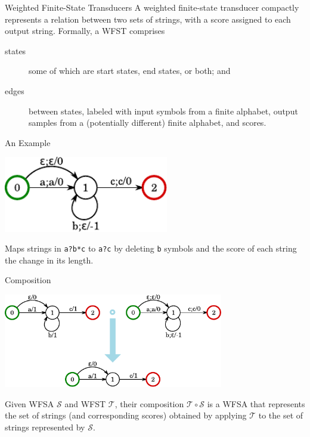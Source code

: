 \begin{frame}{Weighted Finite-State Transducers}{}
  A \alert{weighted finite-state transducer} compactly represents a
  relation between two sets of strings, with a score assigned to each
  output string.
  \vfill
  Formally, a WFST comprises
  \begin{description}
  \item[states] some of which are start states, end states, or both;
    and
  \item[edges] between states, labeled with input symbols from a
    finite alphabet, output samples from a (potentially different)
    finite alphabet, and scores.
  \end{description}
\end{frame}

\begin{frame}{An Example}{}
  \begin{center}
    \includegraphics[width=72mm]{figures/WFST}
  \end{center}
  \vfill
  Maps strings in {\tt a?b*c} to {\tt a?c} by deleting {\tt b} symbols
  and the score of each string the change in its length.
\end{frame}

\begin{frame}{Composition}{}
  \begin{center}
    \includegraphics[width=96mm]{figures/Composition}
  \end{center}
  \vfill
  Given WFSA $\mathcal{S}$ and WFST $\mathcal{T}$, their composition
  $\mathcal{T} \circ \mathcal{S}$ is a WFSA that represents the set of
  strings (and corresponding scores) obtained by applying
  $\mathcal{T}$ to the set of strings represented by $\mathcal{S}$.
\end{frame}

